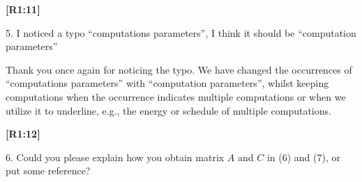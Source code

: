\documentclass[10pt]{letter}
\begin{document}
{\hspace*{-4.5em}\textbf{[R1:11]}\vspace*{-1.9em}}

5. I noticed a typo ``computations parameters'', I think it should be ``computation parameters''

{\color{blue} 

{\hspace*{-4.5em}{[R1:11]}\vspace*{-1.9em}}

Thank you once again for noticing the typo. We have changed the occurrences of ``computations parameters'' with ``computation parameters'', whilst keeping computations when the occurrence indicates multiple computations or when we utilize it to underline, e.g., the energy or schedule of multiple computations.}

{\hspace*{-4.5em}\textbf{[R1:12]}\vspace*{-1.9em}}

6. Could you please explain how you obtain matrix $A$ and $C$ in (6) and (7), or put some reference?
\end{document}
